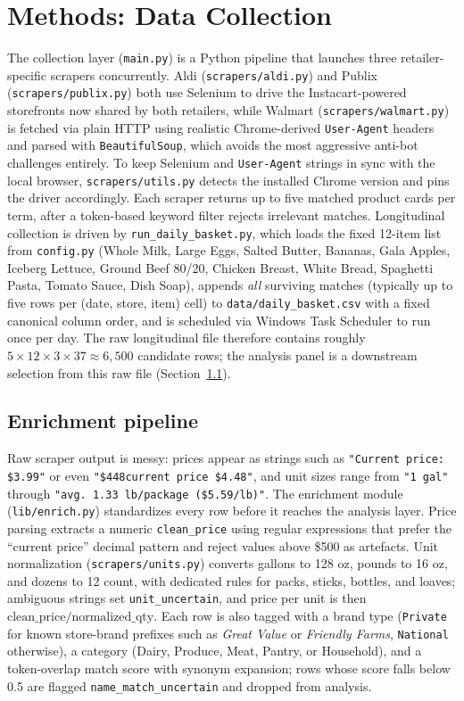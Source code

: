 \documentclass[11pt]{article}
\begin{document}
\section{Methods: Data Collection}

The collection layer (\texttt{main.py}) is a Python pipeline that
launches three retailer-specific scrapers concurrently. Aldi
(\texttt{scrapers/aldi.py}) and Publix (\texttt{scrapers/publix.py})
both use Selenium to drive the Instacart-powered storefronts now
shared by both retailers, while Walmart (\texttt{scrapers/walmart.py})
is fetched via plain HTTP using realistic Chrome-derived
\texttt{User-Agent} headers and parsed with \texttt{BeautifulSoup},
which avoids the most aggressive anti-bot challenges entirely. To keep
Selenium and \texttt{User-Agent} strings in sync with the local
browser, \texttt{scrapers/utils.py} detects the installed Chrome
version and pins the driver accordingly. Each scraper returns up to
five matched product cards per term, after a token-based keyword
filter rejects irrelevant matches. Longitudinal collection is driven
by \texttt{run\_daily\_basket.py}, which loads the fixed 12-item list
from \texttt{config.py} (Whole Milk, Large Eggs, Salted Butter,
Bananas, Gala Apples, Iceberg Lettuce, Ground Beef 80/20, Chicken
Breast, White Bread, Spaghetti Pasta, Tomato Sauce, Dish Soap),
appends \emph{all} surviving matches (typically up to five rows per
(date, store, item) cell) to \texttt{data/daily\_basket.csv} with a
fixed canonical column order, and is scheduled via Windows Task
Scheduler to run once per day. The raw longitudinal file therefore
contains roughly $5 \times 12 \times 3 \times 37 \approx 6{,}500$
candidate rows; the analysis panel is a downstream selection from
this raw file (Section~\ref{sec:enrich}).

\subsection{Enrichment pipeline}\label{sec:enrich}

Raw scraper output is messy: prices appear as strings such as
\texttt{"Current price: \$3.99"} or even \texttt{"\$448current price
\$4.48"}, and unit sizes range from \texttt{"1 gal"} through
\texttt{"avg.\ 1.33 lb/package (\$5.59/lb)"}. The enrichment module
(\texttt{lib/enrich.py}) standardizes every row before it reaches the
analysis layer. Price parsing extracts a numeric \texttt{clean\_price}
using regular expressions that prefer the ``current price'' decimal
pattern and reject values above \$500 as artefacts. Unit normalization
(\texttt{scrapers/units.py}) converts gallons to 128 oz, pounds to 16
oz, and dozens to 12 count, with dedicated rules for packs, sticks,
bottles, and loaves; ambiguous strings set \texttt{unit\_uncertain},
and price per unit is then $\text{clean\_price} /
\text{normalized\_qty}$. Each row is also tagged with a brand type
(\texttt{Private} for known store-brand prefixes such as
\textit{Great Value} or \textit{Friendly Farms},
\texttt{National} otherwise), a category (Dairy, Produce, Meat,
Pantry, or Household), and a token-overlap match score with synonym
expansion; rows whose score falls below 0.5 are flagged
\texttt{name\_match\_uncertain} and dropped from analysis.
\end{document}
